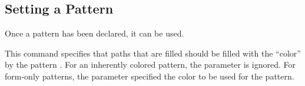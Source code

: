 \subsection{Setting a Pattern}

Once a pattern has been declared, it can be used.

\begin{command}{\pgfsetfillpattern{}}
  This command specifies that paths that are filled should be filled
  with the ``color'' by the pattern . For an inherently
  colored pattern, the  parameter is ignored. For
  form-only patterns, the  parameter specified the color
  to be used for the pattern.
\begin{codeexample}[]
\end{codeexample} 
\end{command}



